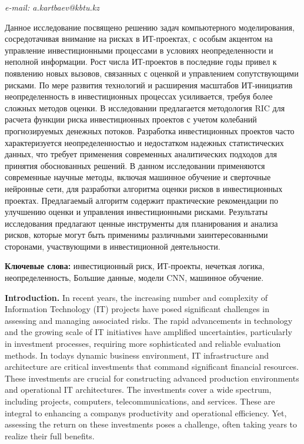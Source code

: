 \documentclass[
]{article}
\begin{document}
\emph{e-mail: a.kartbaev@kbtu.kz}

Данное исследование посвящено решению задач компьютерного моделирования,
сосредотачивая внимание на рисках в ИТ-проектах, с особым акцентом на
управление инвестиционными процессами в условиях неопределенности и
неполной информации. Рост числа ИТ-проектов в последние годы привел к
появлению новых вызовов, связанных с оценкой и управлением
сопутствующими рисками. По мере развития технологий и расширения
масштабов ИТ-инициатив неопределенность в инвестиционных процессах
усиливается, требуя более сложных методов оценки. В исследовании
предлагается методология RIC для расчета функции риска инвестиционных
проектов с учетом колебаний прогнозируемых денежных потоков. Разработка
инвестиционных проектов часто характеризуется неопределенностью и
недостатком надежных статистических данных, что требует применения
современных аналитических подходов для принятия обоснованных решений. В
данном исследовании применяются современные научные методы, включая
машинное обучение и сверточные нейронные сети, для разработки алгоритма
оценки рисков в инвестиционных проектах. Предлагаемый алгоритм содержит
практические рекомендации по улучшению оценки и управления
инвестиционными рисками. Результаты исследования предлагают ценные
инструменты для планирования и анализа рисков, которые могут быть
применимы различными заинтересованными сторонами, участвующими в
инвестиционной деятельности.

\textbf{Ключевые слова:} инвестиционный риск, ИТ-проекты, нечеткая
логика, неопределенность, Большие данные, модели CNN, машинное обучение.

\textbf{Introduction.} In recent years, the increasing number and
complexity of Information Technology (IT) projects have posed
significant challenges in assessing and managing associated risks. The
rapid advancements in technology and the growing scale of IT initiatives
have amplified uncertainties, particularly in investment processes,
requiring more sophisticated and reliable evaluation methods. In
today\textquotesingle s dynamic business environment, IT infrastructure
and architecture are critical investments that command significant
financial resources. These investments are crucial for constructing
advanced production environments and operational IT architectures. The
investments cover a wide spectrum, including projects, computers,
telecommunications, and services. These are integral to enhancing a
company\textquotesingle s productivity and operational efficiency. Yet,
assessing the return on these investments poses a challenge, often
taking years to realize their full benefits.
\end{document}
